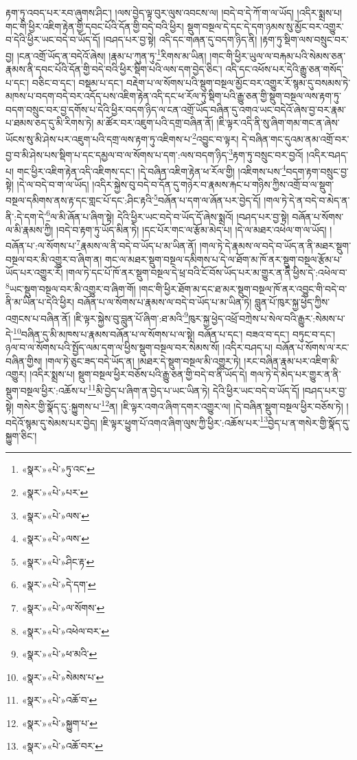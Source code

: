 རྟག་ཏུ་འབད་པར་རབ་ཞུགས་ཤིང་། །ལས་བྱེད་ལྟ་བུར་ལུས་འབངས་ལ། །བདེ་བ་དེ་ཀོ་ག་ལ་ཡོད། །འདིར་སྨྲས་པ། གང་གི་ཕྱིར་འཇིག་རྟེན་གྱི་དབང་པོའི་དོན་གྱི་བདེ་བའི་ཕྱིར། སྡུག་བསྔལ་དེ་དང་དེ་དག་ཉམས་སུ་མྱོང་བར་འགྱུར་བ་དེའི་ཕྱིར་ཡང་བདེ་བ་ཡོད་དོ། །བཤད་པར་བྱ་སྟེ། འདི་དང་གཞན་དུ་བདག་ཉིད་ནི། །རྟག་ཏུ་སྡིག་ལས་བསྲུང་བར་བྱ། །ངན་འགྲོ་ཡོད་ན་བདེའོ་ཞེས། །རྣམ་པ་ཀུན་ཏུ་\footnote{«སྣར་»«པེ་»ཏུ་འང་}རིགས་མ་ཡིན། །གང་གི་ཕྱིར་ཡུལ་ལ་བརྐམ་པའི་སེམས་ཅན་རྣམས་ནི་དབང་པོའི་དོན་གྱི་བདེ་བའི་ཕྱིར་སྡིག་པའི་ལས་དག་བྱེད་ཅིང་། འདི་དང་འཕོས་པར་དེའི་རྒྱུ་ཅན་གསོད་པ་དང་། བཅིང་བ་དང་། བསྡམ་པ་དང་། བརྡེག་པ་ལ་སོགས་པའི་སྡུག་བསྔལ་མྱོང་བར་འགྱུར་རོ་སྙམ་དུ་བསམས་ཏེ་མཁས་པ་བདག་བདེ་བར་འདོད་པས་འཇིག་རྟེན་འདི་དང་ཕ་རོལ་ཏུ་སྡིག་པའི་རྒྱུ་ཅན་གྱི་སྡུག་བསྔལ་ལས་རྟག་ཏུ་བདག་བསྲུང་བར་བྱ་དགོས་པ་དེའི་ཕྱིར་བདག་ཉིད་ལ་ངན་འགྲོ་ཡོད་བཞིན་དུ་འགའ་ཡང་བདེའོ་ཞེས་བྱ་བར་རྣམ་པ་ཐམས་ཅད་དུ་མི་རིགས་ཏེ། མ་ཚོར་བར་འཇུག་པའི་དགྲ་བཞིན་ནོ། །ཇི་ལྟར་འདི་ནི་སུ་ཞིག་གམ་གང་ན་ཞེས་ཡོངས་སུ་མི་ཤེས་པར་འཇུག་པའི་དགྲ་ལས་རྟག་ཏུ་འཇིགས་པ་\footnote{«སྣར་»«པེ་»པར་}འབྱུང་བ་ལྟར། དེ་བཞིན་གང་དུའམ་ནམ་འགྲོ་བར་བྱ་བ་མི་ཤེས་པས་སྡིག་པ་དང་དམྱལ་བ་ལ་སོགས་པ་དག་:ལས་བདག་ཉིད་\footnote{«སྣར་»«པེ་»ལས་}རྟག་ཏུ་བསྲུང་བར་བྱའོ། །འདིར་བཤད་པ། གང་ཕྱིར་འཇིག་རྟེན་འདི་འཇིགས་དང་། །དེ་བཞིན་འཇིག་རྟེན་ཕ་རོལ་གྱི། །འཇིགས་པས་\footnote{«སྣར་»«པེ་»ལས་}བདག་རྟག་བསྲུང་བྱ་སྟེ། །དེ་ལ་བདེ་བ་ག་ལ་ཡོད། །འདིར་སྐྱེས་བུ་བདེ་བ་དོན་དུ་གཉེར་བ་རྣམས་རྐང་པ་གཉིས་ཀྱིས་འགྲོ་བ་ལ་སྡུག་བསྔལ་དམིགས་ནས་རྟ་དང་གླང་པོ་དང་:ཤིང་རྟའི་\footnote{«སྣར་»«པེ་»ཤིང་རྟ་}བཞོན་པ་དག་ལ་ཞོན་པར་བྱེད་དོ། །གལ་ཏེ་དེ་ན་བདེ་བ་མེད་ན་ནི་:དེ་དག་དེ་\footnote{«སྣར་»«པེ་»དེ་དག་}ལ་མི་ཞོན་པ་ཞིག་སྟེ། དེའི་ཕྱིར་ཡང་བདེ་བ་ཡོད་དོ་ཞེས་སྨྲའོ། །བཤད་པར་བྱ་སྟེ། བཞོན་པ་སོགས་ལ་མི་རྣམས་ཀྱི། །བདེ་བ་རྟག་ཏུ་ཡོད་མིན་ཏེ། །དང་པོར་གང་ལ་རྩོམ་མེད་པ། །དེ་ལ་མཐར་འཕེལ་ག་ལ་ཡོད། །བཞོན་པ་:ལ་སོགས་པ་\footnote{«སྣར་»«པེ་»ལ་སོགས་}རྣམས་ལ་ནི་བདེ་བ་ཡོད་པ་མ་ཡིན་ནོ། །གལ་ཏེ་དེ་རྣམས་ལ་བདེ་བ་ཡོད་ན་ནི་མཐར་སྡུག་བསྔལ་བར་མི་འགྱུར་བ་ཞིག་ན། གང་ལ་མཐར་སྡུག་བསྔལ་དམིགས་པ་དེ་ལ་ཐོག་མ་ཁོ་ནར་སྡུག་བསྔལ་རྩོམ་པ་ཡོད་པར་འགྱུར་རོ། །གལ་ཏེ་དང་པོ་ཁོ་ནར་སྡུག་བསྔལ་དེ་ཕྲ་བའི་ངོ་བོས་ཡོད་པར་མ་གྱུར་ན་ནི་ཕྱིས་དེ་:འཕེལ་བ་\footnote{«སྣར་»«པེ་»འཕེལ་བར་}ཡང་སྡུག་བསྔལ་བར་མི་འགྱུར་བ་ཞིག་གོ། །གང་གི་ཕྱིར་ཐོག་མ་དང་ཐ་མར་སྡུག་བསྔལ་ཁོ་ནར་འབྱུང་གི་བདེ་བ་ནི་མ་ཡིན་པ་དེའི་ཕྱིར། བཞོན་པ་ལ་སོགས་པ་རྣམས་ལ་བདེ་བ་ཡོད་པ་མ་ཡིན་ཏེ། བླུན་པོ་ཁུར་སྐྱ་ཕྱེད་ཀྱིས་འགྲངས་པ་བཞིན་ནོ། །ཇི་ལྟར་སྐྱེས་བུ་བླུན་པོ་ཞིག་:ཐ་མའི་\footnote{«སྣར་»«པེ་»ཕ་མའི་}ཁུར་སྐྱ་ཕྱེད་འཕྲོ་བཀྲེས་པ་སེལ་བའི་རྒྱུར་:སེམས་པ་དེ་\footnote{«སྣར་»«པེ་»སེམས་པ་}བཞིན་དུ་མི་མཁས་པ་རྣམས་བཞོན་པ་ལ་སོགས་པ་ལ་སྟེ། བཞོན་པ་དང་། བཟའ་བ་དང་། བཏུང་བ་དང་། ཉལ་བ་ལ་སོགས་པའི་སྤྱོད་ལམ་དག་ལ་ཕྱིས་སྡུག་བསྔལ་བར་སེམས་སོ། །འདིར་བཤད་པ། བཞོན་པ་སོགས་ལ་རང་བཞིན་གྱིས། །གལ་ཏེ་ཅུང་ཟད་བདེ་ཡོད་ན། །མཐར་དེ་སྡུག་བསྔལ་མི་འགྱུར་ཏེ། །རང་བཞིན་རྣམ་པར་འཇིག་མི་འགྱུར། །འདིར་སྨྲས་པ། སྡུག་བསྔལ་ཕྱིར་བཅོས་པའི་རྒྱུ་ཅན་གྱི་བདེ་བ་ནི་ཡོད་དེ། གལ་ཏེ་དེ་མེད་པར་གྱུར་ན་ནི་སྡུག་བསྔལ་ཕྱིར་:འཆོས་པ་\footnote{«སྣར་»«པེ་»འཆོ་བ་}མི་བྱེད་པ་ཞིག་ན་བྱེད་པ་ཡང་ཡིན་ཏེ། དེའི་ཕྱིར་ཡང་བདེ་བ་ཡོད་དོ། །བཤད་པར་བྱ་སྟེ། གསེར་གྱི་སྣོད་དུ་:སྐྱུགས་པ་\footnote{«སྣར་»«པེ་»སྐྱུག་པ་}ན། །ཇི་ལྟར་འགའ་ཞིག་དགར་འགྱུར་ལ། །དེ་བཞིན་སྡུག་བསྔལ་ཕྱིར་བཅོས་ཏེ། །བདེའོ་སྙམ་དུ་སེམས་པར་བྱེད། །ཇི་ལྟར་ཕྱུག་པོ་འགའ་ཞིག་ལུས་ཀྱི་ཕྱིར་:འཆོས་པར་\footnote{«སྣར་»«པེ་»འཆོ་བར་}བྱེད་པ་ན་གསེར་གྱི་སྣོད་དུ་སྐྱུག་ཅིང་། 